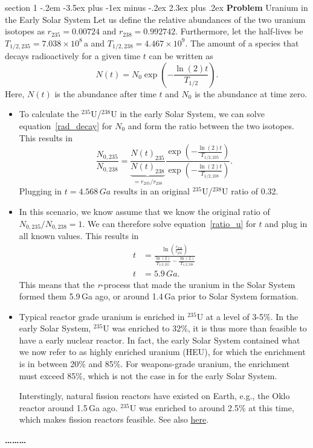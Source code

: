 \documentclass[letterpaper,12pt,twoside=false,DIV=11]{scrartcl}
\makeatletter
\newenvironment{problem}{\@startsection
    {section}
    {1}
    {-.2em}
    {-3.5ex plus -1ex minus -.2ex}
    {2.3ex plus .2ex}
    {
        \pagebreak[3] %
        \noindent\sffamily\bfseries Problem
    }
}
{
    \begin{center}\large\bfseries\ldots\ldots\ldots\end{center}
}
\providecommand{\ex}[1]{\ensuremath{^{#1}}}
\makeatother
\begin{document}
\begin{problem}{Uranium in the Early Solar System}
Let us define the relative abundances of the two uranium isotopes as $r_{235} = 0.00724$ and $r_{238} = 0.992742$. Furthermore, let the half-lives be $T_{1/2,235} = 7.038\times10^{8}$\,a and $T_{1/2,238} = 4.467\times10^{9}$. The amount of a species that decays radioactively for a given time $t$ can be written as
\begin{equation}
    N(t) = N_0 \exp\left(-\frac{\ln(2) t}{T_{1/2}}\right). \label{rad_decay}
\end{equation}
Here, $N(t)$ is the abundance after time $t$ and $N_0$ is the abundance at time zero.

\begin{itemize}
    \item To calculate the \ex{235}U/\ex{238}U in the early Solar System, we can solve equation~\eqref{rad_decay} for $N_0$ and form the ratio between the two isotopes. This results in
    \begin{equation}
        \frac{N_{0,235}}{N_{0,238}} = 
            \underbrace{\frac{N(t)_{235}}{N(t)_{238}}}_{=r_{235}/r_{238}}
            \frac
                {\exp\left(-\frac{\ln(2) t}{T_{1/2,235}}\right)}
                {\exp\left(-\frac{\ln(2) t}{T_{1/2,238}}\right)}. \label{ratio_u}
    \end{equation}
    Plugging in $t=4.568\,Ga$ results in an original \ex{235}U/\ex{238}U ratio of 0.32.
    \item In this scenario, we know assume that we know the original ratio of $N_{0,235}/N_{0,238} = 1$. We can therefore solve equation~\ref{ratio_u} for $t$ and plug in all known values. This results in
    \begin{align}
        t &= \frac{\ln\left(\frac{r_{238}}{r_{235}}\right)}
            {\frac{\ln(2)}{T_{1/2,235}} - \frac{\ln(2)}{T_{1/2,238}}} \\
        t &= 5.9\,Ga.
    \end{align}
    This means that the \textit{r}-process that made the uranium in the Solar System formed them 5.9\,Ga ago, or around 1.4\,Ga prior to Solar System formation. 
    \item Typical reactor grade uranium is enriched in \ex{235}U at a level of 3-5\%. In the early Solar System, \ex{235}U was enriched to 32\%, it is thus more than feasible to have a early nuclear reactor. In fact, the early Solar System contained what we now refer to as highly enriched uranium (HEU), for which the enrichment is in between 20\% and 85\%. For weapons-grade uranium, the enrichment must exceed 85\%, which is not the case in for the early Solar System. 

    Interstingly, natural fission reactors have existed on Earth, e.g., the Oklo reactor around 1.5\,Ga ago. \ex{235}U was enriched to around 2.5\% at this time, which makes fission reactors feasible. See also \href{https://ans.org/pi/np/oklo/}{here}.
\end{itemize}

\end{problem}
\end{document}
